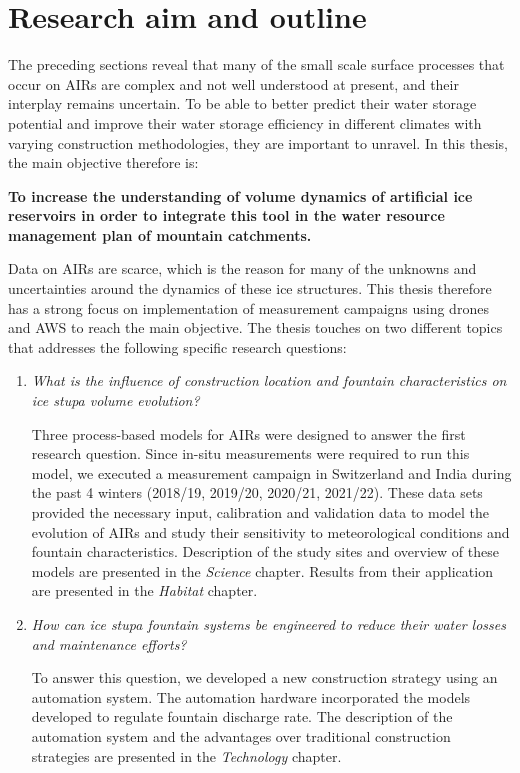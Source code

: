 \section{Research aim and outline}

The preceding sections reveal that many of the small scale surface processes that occur on \ac{AIRs} are complex
and not well understood at present, and their interplay remains uncertain. To be able to better predict their
water storage potential and improve their water storage efficiency in different climates with varying
construction methodologies, they are important to unravel. In this thesis, the main objective therefore is:

\begin{thesis_quotation}

  \textbf{To increase the understanding of volume dynamics of artificial ice reservoirs in order to
  integrate this tool in the water resource management plan of mountain catchments.}

\end{thesis_quotation}

Data on \ac{AIRs} are scarce, which is the reason for many of the unknowns and uncertainties around the dynamics
of these ice structures. This thesis therefore has a strong focus on implementation of measurement campaigns
using drones and \ac{AWS} to reach the main objective. The thesis touches on two different topics that
addresses the following specific research questions:

\begin{enumerate}

  \item \textit{What is the influence of construction location and fountain characteristics on ice stupa volume
    evolution?}

Three process-based models for \ac{AIRs} were designed to answer the first research question. Since in-situ
    measurements were required to run this model, we executed a measurement campaign in Switzerland and India
    during the past 4 winters (2018/19, 2019/20, 2020/21, 2021/22). These data sets provided the necessary
    input, calibration and validation data to model the evolution of \ac{AIRs} and study their sensitivity to
    meteorological conditions and fountain characteristics. Description of the study sites and overview of these
    models are presented in the \textit{Science} chapter. Results from their application are presented in the \textit{Habitat}
    chapter.

  \item \textit{How can ice stupa fountain systems be engineered to reduce their water losses and maintenance
    efforts?}

To answer this question, we developed a new construction strategy using an automation system. The automation
    hardware incorporated the models developed to regulate fountain discharge rate. The description of the
    automation system and the advantages over traditional construction strategies are presented in the
    \textit{Technology} chapter.

\end{enumerate}

